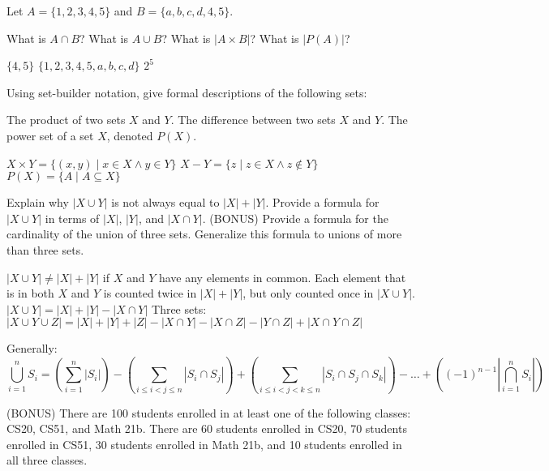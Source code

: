 \documentclass[solution, letterpaper]{cs20inclass}
\begin{document}
\pagebreak

\problem Let $A = \{1,2,3,4,5\}$ and $B = \{a,b,c,d,4,5\}$.

\subproblem What is $A \cap B$?
\subproblem What is $A \cup B$?
\subproblem What is $|A \times B|$?
\subproblem What is $|P(A)|$?

\begin{solution}
\subsolution $\{4,5\}$
\subsolution $\{1,2,3,4,5,a,b,c,d\}$
\subsolution $2^5$
\end{solution}


\problem
Using set-builder notation, give formal descriptions of the following sets:

\subproblem The product of two sets $X$ and $Y$.
\subproblem The difference between two sets $X$ and $Y$.
\subproblem The power set of a set $X$, denoted $P(X)$.

\begin{solution}
\subsolution $X \times Y = \{(x,y) \mid x \in X \wedge y \in Y\}$
\subsolution $X-Y = \{z \mid z \in X \wedge z \notin Y\}$
\subsolution $P(X) = \{A \mid A \subseteq X \}$
\end{solution}


\problem

\subproblem Explain why $|X \cup Y|$ is not always equal to $|X| + |Y|$. 
\subproblem Provide a formula for $|X \cup Y|$ in terms of $|X|$, $|Y|$, and $|X \cap Y|$.
\subproblem (BONUS) Provide a formula for the cardinality of the union of three sets. Generalize this formula to unions of more than three sets.

\begin{solution}
\subsolution $|X \cup Y| \neq |X| + |Y|$ if $X$ and $Y$ have any elements in common. Each element that is in both $X$ and $Y$ is counted twice in $|X| + |Y|$, but only counted once in $|X \cup Y|$.
\subsolution $|X \cup Y| = |X| + |Y| - |X \cap Y|$ 
\subsolution Three sets: $|X \cup Y \cup Z| = |X| + |Y| + |Z| - |X \cap Y| - |X \cap Z| - |Y \cap Z| + |X \cap Y \cap Z|$ 

Generally: $$\bigcup_{i=1}^n S_i = (\sum_{i=1}^n |S_i|) - (\sum_{i \leq i < j \leq n} |S_i \cap S_j|) + (\sum_{i \leq i < j < k \leq n} |S_i \cap S_j \cap S_k|) - \dots + ((-1)^{n-1} |\bigcap_{i=1}^n S_i|)$$
\end{solution}


\problem
(BONUS) There are 100 students enrolled in at least one of the following classes: CS20, CS51, and Math 21b. There are 60 students enrolled in CS20, 70 students enrolled in CS51, 30 students enrolled in Math 21b, and 10 students enrolled in all three classes.
\end{document}
